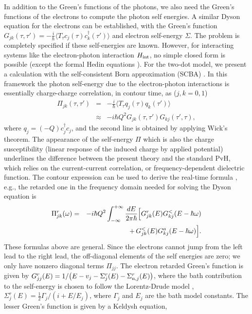 \documentclass[doublecol]{epl2}
\begin{document}
In addition to the Green's functions of the photons, we also need the Green's functions of the
electrons to compute the photon self energies. A similar Dyson equation for the electrons can be established, with the
Green's function \cite{haug96}
$G_{jk}(\tau,\tau') =- \frac{i}{\hbar} \bigl\langle T_\tau  c_j(\tau) c_k^\dagger(\tau') \bigr\rangle $
and electron self-energy $\Sigma$.  The problem is completely specified if these self-energies are known.  However, for interacting systems like the electron-photon interaction $H_{{\rm int}}$, no simple closed 
form is possible (except
the formal Hedin equations \cite{hedin65}).   For the two-dot model, we present a calculation
with the self-consistent Born approximation (SCBA) \cite{bruus04}.  In this framework the photon self-energy due to the electron-photon interactions is 
essentially charge-charge correlation, in contour time, as ($j,k=0,1$)
\begin{eqnarray}
\Pi_{jk}(\tau,\tau') & = & - \frac{i}{\hbar} \bigl\langle T_{\tau} q_j(\tau) q_k(\tau') \bigr\rangle \nonumber \\
&\approx & -i\hbar Q^2 G_{jk}(\tau,\tau') G_{kj}(\tau',\tau),
\end{eqnarray}
where $q_j = (-Q) c_j^\dagger c_j$, and the second line is obtained by applying Wick's theorem.
The appearance of the self-energy $\Pi$ which is also the charge susceptibility (linear response of the induced charge by applied potential) underlines the difference between 
the present theory and the standard PvH, which relies on the current-current correlation, or frequency-dependent 
dielectric function.   The contour expression can be used to derive
the real-time formula \cite{haug96}, e.g., the retarded one in the frequency domain needed for solving the Dyson equation is 
\begin{eqnarray}
\Pi_{jk}^r(\omega) &=& -i\hbar Q^2 \int_{-\infty}^{+\infty} {dE\over 2\pi\hbar}
\Big[ G^r_{jk}(E) G^<_{kj}(E-\hbar \omega) \nonumber \\
&&  + \,
G^<_{jk}(E) G^a_{kj}(E-\hbar\omega) \Big].
\end{eqnarray}
These formulas above are general. Since the electrons cannot jump from the left lead to the right lead, 
the off-diagonal elements of the self energies are
zero; we only have
nonzero diagonal terms $\Pi_{jj}$.
The electron retarded Green's function is given by $G^r_{jj}(E) = 
1/\bigl(E - v_j - \Sigma^r_j(E) - \Sigma^r_{{\rm n},j}(E)\bigr)$, where the bath contribution to the self-energy is chosen to follow the Lorentz-Drude model \cite{wingreen-meir94}, $\Sigma^r_j(E) =  \frac{1}{2} \Gamma_j/(i + E/E_j)$, where $\Gamma_j$ and $E_j$ are the bath model constants.  The lesser Green's function is given by a Keldysh equation,
\end{document}
